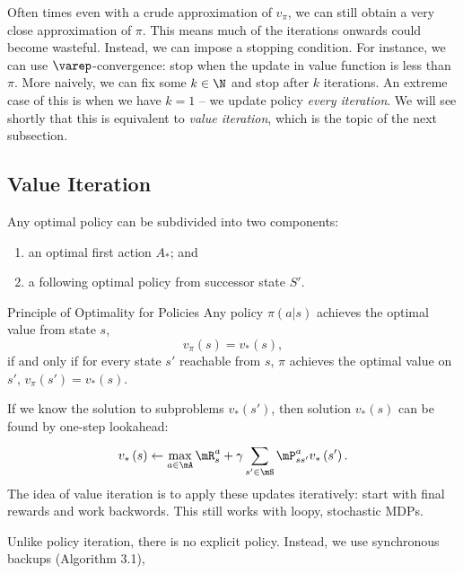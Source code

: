 \documentclass[RL]{subfiles}
\begin{document}
    \np Often times even with a crude approximation of $v_{\pi}$, we can still obtain a very close approximation of $\pi$. This means much of the iterations onwards could become wasteful. Instead, we can impose a stopping condition. For instance, we can use $\varep$-convergence: stop when the update in value function is less than $\pi$. More naively, we can fix some $k\in\N$ and stop after $k$ iterations. An extreme case of this is when we have $k=1$ -- we update policy \textit{every iteration}. We will see shortly that this is equivalent to \textit{value iteration}, which is the topic of the next subsection.

   \subsection{Value Iteration}

   Any optimal policy can be subdivided into two components:
   \begin{enumerate}
       \item an optimal first action $A_*$; and
        \item a following optimal policy from successor state $S'$.
   \end{enumerate}
    
   \begin{theorem}{Principle of Optimality for Policies}
       Any policy $\pi\left( a|s \right)$ achieves the optimal value from state $s$,
       \begin{equation*}
           v_{\pi}\left( s \right) = v_{*}\left( s \right),
       \end{equation*}
       if and only if for every state $s'$ reachable from $s$, $\pi$ achieves the optimal value on $s'$, $v_{\pi}\left( s' \right)=v_{*}\left( s \right)$.
   \end{theorem}

   \rruleline

   \np If we know the solution to subproblems $v_{*}\left( s' \right)$, then solution $v_{*}\left( s \right)$ can be found by one-step lookahead:
   \begin{equation}
       v_{*}\left( s \right) \leftarrow \max_{a\in\mA} \mR^a_s + \gamma \sum^{}_{s'\in\mS}\mP^a_{ss'}v_{*}\left( s' \right).
   \end{equation}
   The idea of value iteration is to apply these updates iteratively: start with final rewards and work backwords. This still works with loopy, stochastic MDPs.

   \np Unlike policy iteration, there is no explicit policy. Instead, we use synchronous backups (Algorithm 3.1),
    
\end{document}

